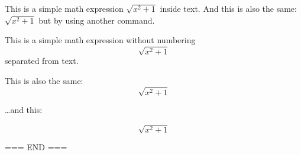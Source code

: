 \documentclass[12pt, letterpaper]{article}
\begin{document}
	This is a simple math expression \(\sqrt{x^2+1}\) inside text. 
	And this is also the same: 
	\begin{math}
		\sqrt{x^2+1}
	\end{math}
	but by using another command.
	
	This is a simple math expression without numbering
	\[\sqrt{x^2+1}\] 
	separated from text.
	
	This is also the same:
	\begin{displaymath}
		\sqrt{x^2+1}
	\end{displaymath}
	
	\ldots and this:
	
	\begin{equation*}
		\sqrt{x^2+1}
	\end{equation*}
	
	=== END === 
		
\end{document}
